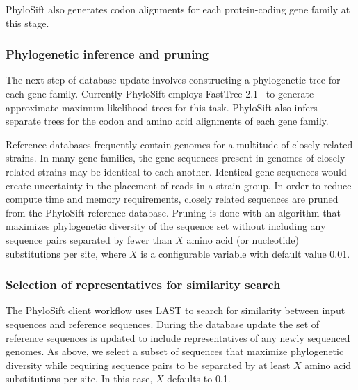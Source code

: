 \documentclass[10pt]{article}
\begin{document}
PhyloSift also generates codon alignments for each protein-coding gene family at this stage.
\subsubsection*{Phylogenetic inference and pruning}
The next step of database update involves constructing a phylogenetic tree for each gene family.
Currently PhyloSift employs FastTree 2.1~\cite{Price2010} to generate approximate maximum likelihood trees for this task.
PhyloSift also infers separate trees for the codon and amino acid alignments of each gene family.

Reference databases frequently contain genomes for a multitude of closely related strains.
In many gene families, the gene sequences present in genomes of closely related strains may be identical to each another.
Identical gene sequences would create uncertainty in the placement of reads in a strain group.
In order to reduce compute time and memory requirements, closely related sequences are pruned from the PhyloSift reference database.
Pruning is done with an algorithm that maximizes phylogenetic diversity of the sequence set without including any sequence pairs separated by fewer than $X$ amino acid (or nucleotide) substitutions per site, where $X$ is a configurable variable with default value 0.01.

\subsubsection*{Selection of representatives for similarity search}
The PhyloSift client workflow uses LAST to search for similarity between input sequences and reference sequences.
During the database update the set of reference sequences is updated to include representatives of any newly sequenced genomes.
As above, we select a subset of sequences that maximize phylogenetic diversity while requiring sequence pairs to be separated by at least $X$ amino acid substitutions per site.
In this case, $X$ defaults to 0.1.
\end{document}
